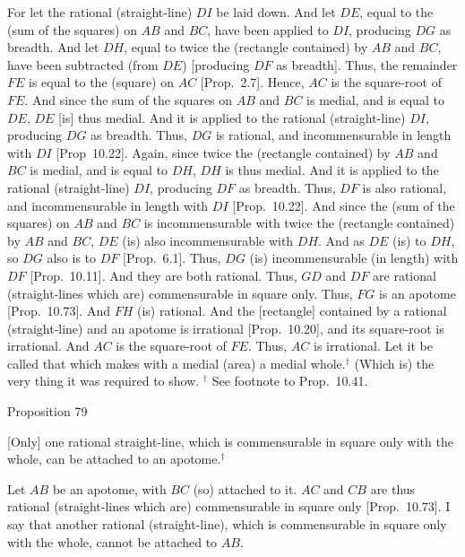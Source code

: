 For let the rational (straight-line) $DI$ be laid down. And let $DE$, equal to
the (sum of the squares) on $AB$ and $BC$, have been applied to $DI$,
producing $DG$ as breadth. And let $DH$, equal to twice the (rectangle
contained) by $AB$ and $BC$, have been subtracted (from $DE$) [producing
$DF$ as breadth]. Thus, the remainder $FE$ is equal to the (square) on 
$AC$ [Prop.~2.7]. Hence, $AC$ is the square-root of $FE$. And since the sum of the squares on $AB$ and $BC$ is medial, and
is equal to $DE$, $DE$ [is] thus medial. And it is applied to the
rational (straight-line) $DI$, producing $DG$ as breadth. Thus, $DG$
is rational, and incommensurable in length with $DI$ [Prop~10.22]. Again, since twice the (rectangle
contained) by $AB$ and $BC$ is medial, and is equal to $DH$, $DH$
is thus medial. And it is applied to the rational (straight-line)
$DI$, producing $DF$ as breadth.  Thus, $DF$ is also rational, and incommensurable in length with $DI$ [Prop.~10.22]. And since  the (sum of the squares)
on $AB$ and $BC$ is incommensurable with twice the (rectangle contained)
by $AB$ and $BC$, $DE$ (is) also incommensurable with $DH$. 
And as $DE$ (is) to $DH$, so $DG$  also is to $DF$ [Prop.~6.1]. Thus, $DG$ (is) incommensurable (in length) with
$DF$ [Prop.~10.11]. And they are both rational. 
Thus, $GD$ and $DF$ are rational (straight-lines which are) commensurable
in square only. Thus, $FG$ is an apotome [Prop.~10.73]. And $FH$ (is) rational. And the
[rectangle] contained by a rational (straight-line) and an apotome is
irrational [Prop.~10.20], and its square-root
is irrational. And $AC$ is the square-root of $FE$.  Thus, $AC$
is irrational. Let it be called that which makes with a medial (area) a medial
whole.$^\dag$ 
(Which is) the very thing it was required to show.
{\footnotesize\noindent$^\dag$ See footnote to Prop.~10.41.}


\begin{center}
{\large Proposition 79}
\end{center}

\mbox{[}Only] one rational straight-line, which is
commensurable in square only with the whole, can be attached to an apotome.$^\dag$

\epsfysize=0.26in 
\centerline{}

Let $AB$ be an apotome, with $BC$  (so) attached to it. $AC$ and $CB$ are thus
rational (straight-lines which are) commensurable in square only [Prop.~10.73]. I say that another rational (straight-line), which is commensurable in  square only with the whole, cannot
be attached to $AB$. 

